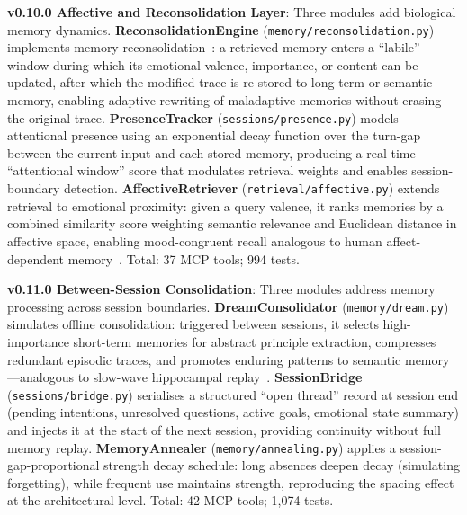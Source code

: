 \documentclass[conference]{IEEEtran}
\begin{document}
\textbf{v0.10.0 Affective and Reconsolidation Layer}: Three modules add biological memory dynamics. \textbf{ReconsolidationEngine} (\texttt{memory/reconsolidation.py}) implements memory reconsolidation~\cite{nader2000fear}: a retrieved memory enters a ``labile'' window during which its emotional valence, importance, or content can be updated, after which the modified trace is re-stored to long-term or semantic memory, enabling adaptive rewriting of maladaptive memories without erasing the original trace. \textbf{PresenceTracker} (\texttt{sessions/presence.py}) models attentional presence using an exponential decay function over the turn-gap between the current input and each stored memory, producing a real-time ``attentional window'' score that modulates retrieval weights and enables session-boundary detection. \textbf{AffectiveRetriever} (\texttt{retrieval/affective.py}) extends retrieval to emotional proximity: given a query valence, it ranks memories by a combined similarity score weighting semantic relevance and Euclidean distance in affective space, enabling mood-congruent recall analogous to human affect-dependent memory~\cite{forgas1995}. Total: 37 MCP tools; 994 tests.

\textbf{v0.11.0 Between-Session Consolidation}: Three modules address memory processing across session boundaries. \textbf{DreamConsolidator} (\texttt{memory/dream.py}) simulates offline consolidation: triggered between sessions, it selects high-importance short-term memories for abstract principle extraction, compresses redundant episodic traces, and promotes enduring patterns to semantic memory---analogous to slow-wave hippocampal replay~\cite{stickgold2005}. \textbf{SessionBridge} (\texttt{sessions/bridge.py}) serialises a structured ``open thread'' record at session end (pending intentions, unresolved questions, active goals, emotional state summary) and injects it at the start of the next session, providing continuity without full memory replay. \textbf{MemoryAnnealer} (\texttt{memory/annealing.py}) applies a session-gap-proportional strength decay schedule: long absences deepen decay (simulating forgetting), while frequent use maintains strength, reproducing the spacing effect at the architectural level. Total: 42 MCP tools; 1,074 tests.
\end{document}
